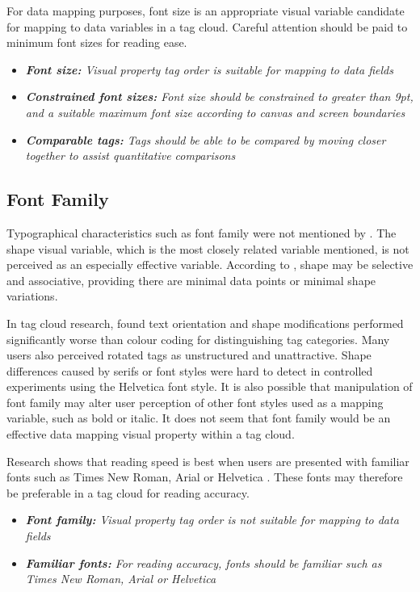 For data mapping purposes, font size is an appropriate visual variable candidate for mapping to data variables in a tag cloud. Careful attention should be paid to minimum font sizes for reading ease. 

\begin{itemize}
	\item \emph{\textbf{Font size:} Visual property tag order is suitable for mapping to data fields}	
	\item \emph{\textbf{Constrained font sizes:} Font size should be constrained to greater than 9pt, and a suitable maximum font size according to canvas and screen boundaries}
	\item \emph{\textbf{Comparable tags:} Tags should be able to be compared by moving closer together to assist quantitative comparisons}
\end{itemize}

\subsection{Font Family}   

Typographical characteristics such as font family were not mentioned by \citet{bertin83}. The shape visual variable, which is the most closely related variable mentioned, is not perceived as an especially effective variable. According to \citet{carpendale03}, shape may be selective and associative, providing there are minimal data points or minimal shape variations. 

In tag cloud research, \citet{waldner13} found text orientation and shape modifications performed significantly worse than colour coding for distinguishing tag categories. Many users also perceived rotated tags as unstructured and unattractive. Shape differences caused by serifs or font styles were hard to detect in controlled experiments using the Helvetica font style. It is also possible that manipulation of font family may alter user perception of other font styles used as a mapping variable, such as bold or italic. It does not seem that font family would be an effective data mapping visual property within a tag cloud. 

Research shows that reading speed is best when users are presented with familiar fonts such as Times New Roman, Arial or Helvetica  \citep[pg 106, chap 11:7][]{usability06}. These fonts may therefore be preferable in a tag cloud for reading accuracy.

\begin{itemize}
	\item \emph{\textbf{Font family:} Visual property tag order is not suitable for mapping to data fields}	
	\item \emph{\textbf{Familiar fonts:} For reading accuracy, fonts should be familiar such as Times New Roman, Arial or Helvetica}	
\end{itemize}

